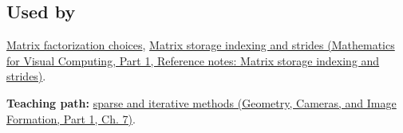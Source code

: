 \subsection{Used by}\label{appendix-67c87a3d9e94-used-by}

\hypertarget{appendix-67c87a3d9e94-used-by}{}

\hyperref[appendix-221a483bec2d]{Matrix factorization choices}, \href{../02-Mathematics-for-Visual-Computing-P01/main.pdf\#nameddest=appendix-ffdc1d4e5350}{Matrix storage indexing and strides (Mathematics for Visual Computing, Part 1, Reference notes: Matrix storage indexing and strides)}.

\textbf{Teaching path:} \href{../03-Geometry-Cameras-and-Image-Formation-P01/main.pdf\#nameddest=02-foundations-ii-ch038-sparse-problems-change-the-economics-of-solving}{sparse and iterative methods (Geometry, Cameras, and Image Formation, Part 1, Ch. 7)}.
